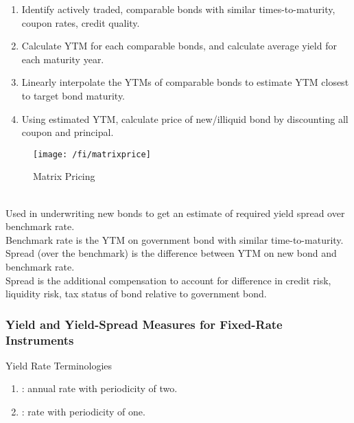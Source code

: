 \begin{method} 
\begin{enumerate}[label=\roman*.]
\setlength{\itemsep}{0pt}
\item Identify actively traded, comparable bonds with similar times-to-maturity, coupon rates, credit quality.
\item Calculate YTM for each comparable bonds, and calculate average yield for each maturity year.
\item Linearly interpolate the YTMs of comparable bonds to estimate YTM closest to target bond maturity.
\item Using estimated YTM, calculate price of new/illiquid bond by discounting all coupon and principal.
\end{enumerate}
\end{method}

\begin{figure}[H]
\centering
\texttt{[image: /fi/matrixprice]}
\caption{Matrix Pricing}
\end{figure}

\begin{remark} \\
Used in underwriting new bonds to get an estimate of required yield spread over benchmark rate.\\
Benchmark rate is the YTM on government bond with similar time-to-maturity.\\
Spread (over the benchmark) is the difference between YTM on new bond and benchmark rate.\\
Spread is the additional compensation to account for difference in credit risk, liquidity risk, tax status of bond relative to government bond.
\end{remark}

\subsubsection{Yield and Yield-Spread Measures for Fixed-Rate Instruments}

\begin{definition} Yield Rate Terminologies 
\begin{enumerate}[label=\roman*.]
\setlength{\itemsep}{0pt}
\item {}: annual rate with periodicity of two.
\item {}: rate with periodicity of one.
\end{enumerate}
\end{definition}

